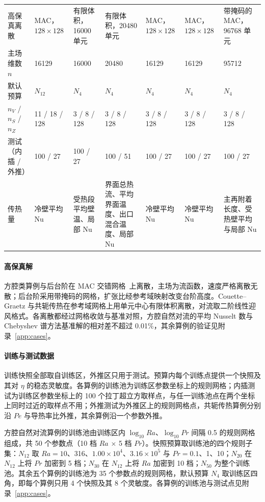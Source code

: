 \begin{table}
\begin{tabular}{p{0.085\textheight}p{0.14\textheight}p{0.135\textheight}p{0.145\textheight}p{0.14\textheight}p{0.14\textheight}p{0.15\textheight}}
高保真离散 & MAC，$128\times128$ & 有限体积，16000 单元 & 有限体积，20480 单元 & MAC，$128\times128$ & MAC，$128\times128$ & 带掩码的 MAC，96768 单元 \\
主场维数 $n$ & 16129 & 16000 & 20480 & 16129 & 16129 & 95712 \\
默认预算 & $N_{12}$ & $N_4$ & $N_4$ & $N_4$ & $N_4$ & $N_4$ \\
$n_V$ / $n_S$ / $n_Z$ & 11 / 18 / 128 & 3 / 8 / 128 & 3 / 8 / 128 & 3 / 8 / 128 & 3 / 8 / 128 & 3 / 8 / 128 \\
测试（内插 / 外推） & 100 / 27 & 100 / 27 & 100 / 51 & 100 / 27 & 100 / 27 & 100 / 27 \\
传热量 & 冷壁平均 Nu & 受热段平均壁温、局部 Nu & 界面总热流、平均界面温度、出口混合温度、局部 Nu & 冷壁平均 Nu & 冷壁平均 Nu & 主再附着长度、受热壁平均与局部 Nu \\
\bottomrule
\end{tabular}
\end{table}

\paragraph{高保真解}
方腔类算例与后台阶在 MAC 交错网格~\cite{harlow1965numerical}上离散，主场为流函数，速度严格离散无散；后台阶采用带掩码的网格，扩张比经参考域映射改变台阶高度。Couette--Graetz 与共轭传热在参考域网格上用单元中心有限体积离散，对流取二阶线性迎风格式。各离散都经过网格收敛与基准对照，方腔自然对流的平均 Nusselt 数与 Chebyshev 谱方法基准解的相对差不超过 0.01\%，其余算例的验证见附录~\ref{app:cases}。

\paragraph{训练与测试数据}
训练快照全部取自训练区，外推区只用于测试。预算内每个训练点提供一个快照及其对 $\eta$ 的稳态灵敏度。各算例的训练池为训练区参数坐标上的规则网格；内插测试为训练区参数坐标上的 100 个拉丁超立方取样点，与任一训练池点在两个坐标上同时过近的取样点不用；外推测试为外推区上的规则网格点，共轭传热算例分别沿 $Pe$ 与导热率比外推，其余算例沿一个参数外推。

方腔自然对流算例的训练池由训练区内 $\log_{10}Ra$、$\log_{10}Pr$ 间隔 0.5 的规则网格组成，共 50 个参数点（10 档 $Ra$ $\times$ 5 档 $Pr$）。快照预算取训练池的四个规则子集：$N_{12}$ 取 $Ra=10$、316、$1.00\times10^4$、$3.16\times10^5$ 与 $Pr=0.1$、1、10；$N_{20}$ 在 $N_{12}$ 上将 $Pr$ 加密到 5 档；$N_{30}$ 在 $N_{12}$ 上将 $Ra$ 加密到 10 档；$N_{50}$ 为整个训练池。其余五个算例的训练池为 35 个参数点的规则网格，默认预算 $N_4$ 取训练区四角，即每个算例只用 4 个快照及其 8 个灵敏度。各算例的训练池与测试点见附录~\ref{app:cases}。

